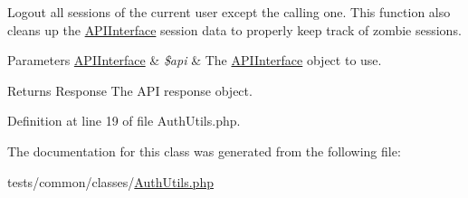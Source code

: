 Logout all sessions of the current user except the calling one. This function also cleans up the \hyperlink{classlibresignage_1_1tests_1_1common_1_1classes_1_1APIInterface}{A\+P\+I\+Interface} session data to properly keep track of zombie sessions.


\begin{DoxyParams}[1]{Parameters}
\hyperlink{classlibresignage_1_1tests_1_1common_1_1classes_1_1APIInterface}{A\+P\+I\+Interface} & {\em \$api} & The \hyperlink{classlibresignage_1_1tests_1_1common_1_1classes_1_1APIInterface}{A\+P\+I\+Interface} object to use.\\
\hline
\end{DoxyParams}
\begin{DoxyReturn}{Returns}
Response The A\+PI response object. 
\end{DoxyReturn}


Definition at line 19 of file Auth\+Utils.\+php.



The documentation for this class was generated from the following file\+:\begin{DoxyCompactItemize}
\item 
tests/common/classes/\hyperlink{AuthUtils_8php}{Auth\+Utils.\+php}\end{DoxyCompactItemize}
